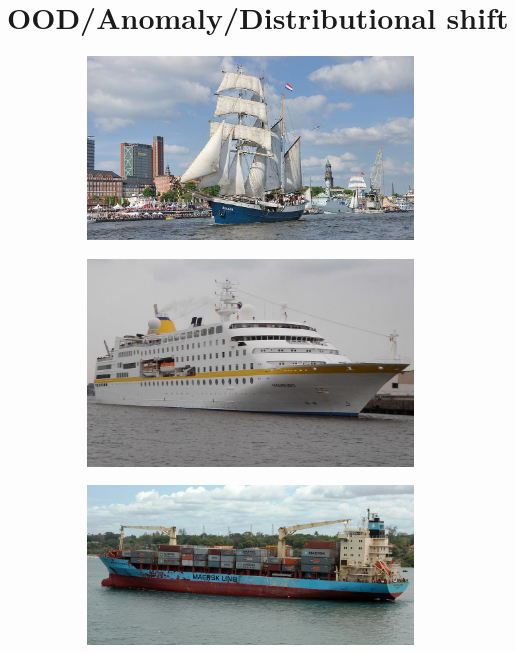 \section{OOD/Anomaly/Distributional shift}
\label{sec:oodvanom}
\begin{figure}[h!]
    \begin{subfigure}{0.333\textwidth}
        \centering
        \includegraphics[height=0.15\textheight,width=0.95\textwidth]{images/intro_ood_anomaly/old_ship.jpg}
        \caption{}
        \label{fig:old_ship}
    \end{subfigure}
    \begin{subfigure}{0.333\textwidth}
        \centering
        \includegraphics[height=0.15\textheight,width=0.95\textwidth]{images/intro_ood_anomaly/Trainer_cruiser.jpeg}
        \caption{}
        \label{fig:trian_cruiser}
    \end{subfigure}
    \begin{subfigure}{0.333\textwidth}
        \centering
        \includegraphics[height=0.15\textheight,width=0.95\textwidth]{images/intro_ood_anomaly/Anomaly_container.jpg}

\end{subfigure}
\end{figure}
